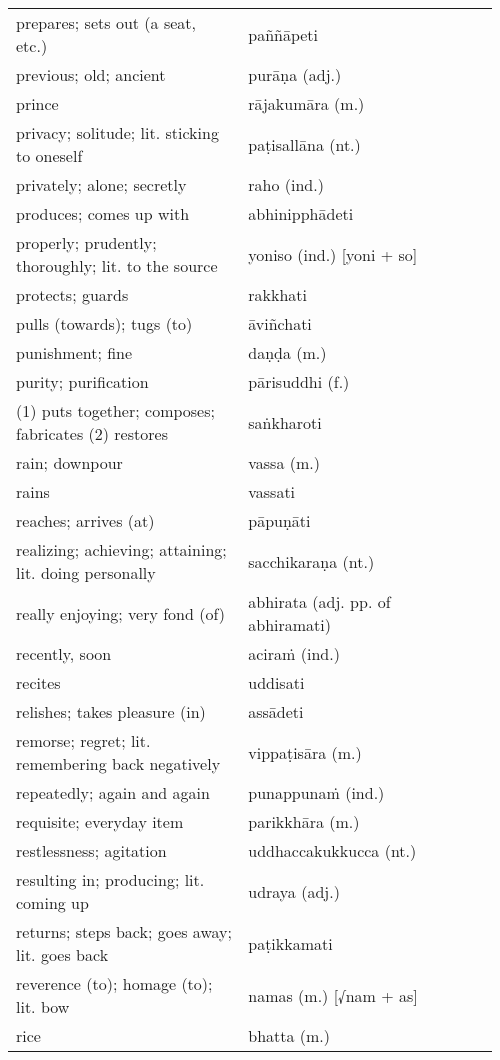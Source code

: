 \documentclass[a5paper]{memoir}
\begin{document}
\begin{longtable}{L{0.48\linewidth} L{0.48\linewidth} H}
prepares; sets out (a seat, etc.) & paññāpeti & \\[0pt]
previous; old; ancient & purāṇa (adj.) & \\[0pt]
prince & rājakumāra (m.) & \\[0pt]
privacy; solitude; lit. sticking to oneself & paṭisallāna (nt.) & \\[0pt]
privately; alone; secretly & raho (ind.) & \\[0pt]
produces; comes up with & abhinipphādeti & \\[0pt]
properly; prudently; thoroughly; lit. to the source & yoniso (ind.) [yoni + so] & \\[0pt]
protects; guards & rakkhati & \\[0pt]
pulls (towards); tugs (to) & āviñchati & \\[0pt]
punishment; fine & daṇḍa (m.) & \\[0pt]
purity; purification & pārisuddhi (f.) & \\[0pt]
(1) puts together; composes; fabricates (2) restores & saṅkharoti & \\[0pt]
rain; downpour & vassa (m.) & \\[0pt]
rains & vassati & \\[0pt]
reaches; arrives (at) & pāpuṇāti & \\[0pt]
realizing; achieving; attaining; lit. doing personally & sacchikaraṇa (nt.) & \\[0pt]
really enjoying; very fond (of) & abhirata (adj. pp. of abhiramati) & \\[0pt]
recently, soon & aciraṁ (ind.) & \\[0pt]
recites & uddisati & \\[0pt]
relishes; takes pleasure (in) & assādeti & \\[0pt]
remorse; regret; lit. remembering back negatively & vippaṭisāra (m.) & \\[0pt]
repeatedly; again and again & punappunaṁ (ind.) & \\[0pt]
requisite; everyday item & parikkhāra (m.) & \\[0pt]
restlessness; agitation & uddhaccakukkucca (nt.) & \\[0pt]
resulting in; producing; lit. coming up & udraya (adj.) & \\[0pt]
returns; steps back; goes away; lit. goes back & paṭikkamati & \\[0pt]
reverence (to); homage (to); lit. bow & namas (m.) [√nam + as] & \\[0pt]
rice & bhatta (m.) & \\[0pt]

\end{longtable}
\end{document}
